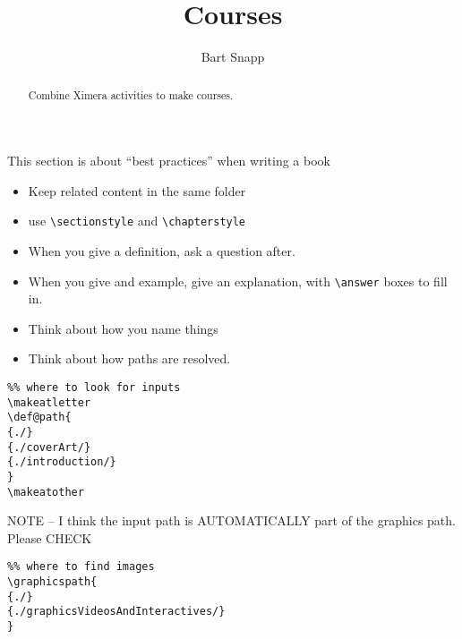 \documentclass{ximera}
\title{Courses}
\author{Bart Snapp}
\begin{document}
\begin{abstract}
    Combine Ximera activities to make courses.
\end{abstract}
\maketitle

This section is about ``best practices'' when writing a book
\begin{itemize}
    \item Keep related content in the same folder
    \item use \texttt{\textbackslash sectionstyle} and
          \texttt{\textbackslash chapterstyle}
    \item When you give a definition, ask a question after.
    \item When you give and example, give an explanation, with
          \texttt{\textbackslash answer} boxes to fill in.
    \item Think about how you name things
    \item Think about how paths are resolved.
\end{itemize}

\begin{example}
\begin{verbatim} 
%% where to look for inputs
\makeatletter
\def@path{
{./}
{./coverArt/}
{./introduction/}
}
\makeatother   
\end{verbatim}
\end{example}

NOTE -- I think the input path is AUTOMATICALLY part of the graphics path. Please CHECK
\begin{example}
\begin{verbatim}
%% where to find images
\graphicspath{  
{./}
{./graphicsVideosAndInteractives/}
}    
\end{verbatim}
\end{example}
    
    
    
\end{document}
